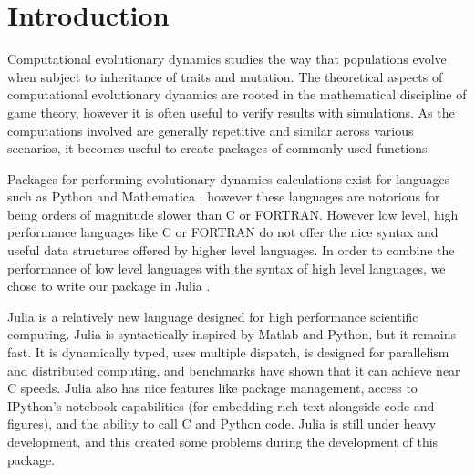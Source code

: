 \section{Introduction}

Computational evolutionary dynamics studies the way that populations evolve when subject to inheritance of traits and mutation.
The theoretical aspects of computational evolutionary dynamics are rooted in the mathematical discipline of game theory, however it is often useful to verify results with simulations.
As the computations involved are generally repetitive and similar across various scenarios, it becomes useful to create packages of commonly used functions.

Packages for performing evolutionary dynamics calculations exist for languages such as Python \cite{pyevodyn} and Mathematica \cite{dynamo}. however these languages are notorious for being orders of magnitude slower than C or FORTRAN.
However low level, high performance languages like C or FORTRAN do not offer the nice syntax and useful data structures offered by higher level languages.
In order to combine the performance of low level languages with the syntax of high level languages, we chose to write our package in Julia \cite{julia}.

Julia is a relatively new language designed for high performance scientific computing.
Julia is syntactically inspired by Matlab and Python, but it remains fast.
It is dynamically typed, uses multiple dispatch, is designed for parallelism and distributed computing, and benchmarks have shown that it can achieve near C speeds.
Julia also has nice features like package management, access to IPython's notebook capabilities (for embedding rich text alongside code and figures), and the ability to call C and Python code.
Julia is still under heavy development, and this created some problems during the development of this package.
